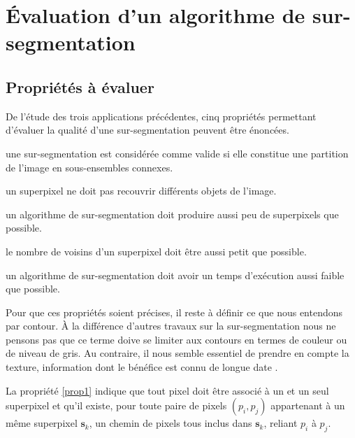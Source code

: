 \section{Évaluation d'un algorithme de sur-segmentation}
\subsection{Propriétés à évaluer}

De l'étude des trois applications précédentes, cinq propriétés permettant d'évaluer la qualité d'une sur-segmentation peuvent être énoncées. 
\begin{prop}[validité]
\label{prop1}
une sur-segmentation est considérée comme valide si elle constitue une partition de l'image en sous-ensembles connexes.
\end{prop}

\begin{prop}
\label{prop2}
un superpixel ne doit pas recouvrir différents objets de l'image.
\end{prop}

\begin{prop}[concision]
\label{prop3}
un algorithme de sur-segmentation doit produire aussi peu de superpixels que possible.
\end{prop}

\begin{prop}[simplicité]
\label{prop4}
le nombre de voisins d'un superpixel doit être aussi petit que possible.  
\end{prop}

\begin{prop}[rapidité]
\label{prop5}
un algorithme de sur-segmentation doit avoir un temps d'exécution aussi faible que possible.
\end{prop}

Pour que ces propriétés soient précises, il reste à définir ce que nous entendons par contour. À la différence d'autres travaux sur la sur-segmentation \cite{machairas2015waterpixels} nous ne pensons pas que ce terme doive se limiter aux contours en termes de couleur ou de  niveau de gris. Au contraire, il nous semble essentiel de prendre en compte la texture,  information dont le bénéfice est connu de longue date \cite{ozden2005image}.

La propriété \ref{prop1} indique que tout pixel doit être associé à un et un seul superpixel et qu'il existe, pour toute paire de pixels $(p_{i},p_{j})$ appartenant à un même superpixel $\mathbf{s}_{k}$, un chemin de pixels  tous inclus dans $\mathbf{s}_{k}$, reliant $p_{i}$ à $p_{j}$. 

